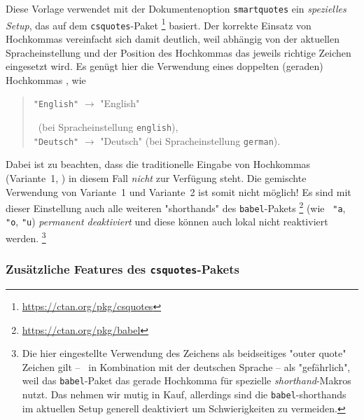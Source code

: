 Diese Vorlage verwendet mit der Dokumentenoption \texttt{smartquotes}
ein \emph{spezielles Setup}, das auf dem \texttt{csquotes}-Paket%
\footnote{\url{https://ctan.org/pkg/csquotes}}
basiert. Der korrekte Einsatz von Hochkommas vereinfacht sich damit deutlich,
weil abhängig von der aktuellen Spracheinstellung und der Position des
Hochkommas das jeweils richtige Zeichen eingesetzt wird. Es genügt hier die
Verwendung eines doppelten (geraden) Hochkommas \texttt{\textquotedbl}, wie \zB
%
\begin{quote}
    \begin{english}
        \verb!"English"! $\rightarrow$ "English"
    \end{english}\ (bei Spracheinstellung \texttt{english}),\\
    \verb!"Deutsch"! $\rightarrow$ "Deutsch" (bei Spracheinstellung
    \texttt{german}).
\end{quote}
%
Dabei ist zu beachten, dass die traditionelle Eingabe von Hochkommas
(Variante~1, \so) in diesem Fall \emph{nicht} zur Verfügung steht. Die
gemischte Verwendung von Variante~1 und Variante~2 ist somit nicht möglich!
Es sind mit dieser Einstellung auch alle weiteren "shorthands" des
\texttt{babel}-Pakets%
\footnote{\url{https://ctan.org/pkg/babel}}
(wie \zB\ \verb!"a!, \verb!"o!, \verb!"u!) \emph{permanent deaktiviert} und
diese können auch lokal nicht reaktiviert werden.%
\footnote{Die hier eingestellte Verwendung des \texttt{\textquotedbl}
Zeichens als beidseitiges "outer quote" Zeichen gilt -- \va\ in Kombination
mit der deutschen Sprache -- als "gefährlich", weil das \texttt{babel}-Paket
das gerade Hochkomma für spezielle \emph{shorthand}-Makros nutzt. Das nehmen
wir mutig in Kauf, allerdings sind die \texttt{babel}-shorthands im aktuellen
Setup generell deaktiviert um Schwierigkeiten zu vermeiden.}

\subsubsection{Zusätzliche Features des \texttt{csquotes}-Pakets}

